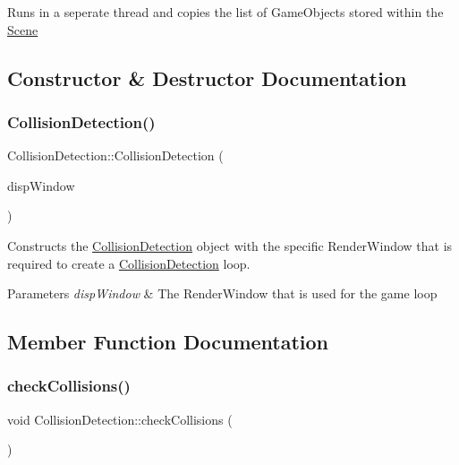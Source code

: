 Runs in a seperate thread and copies the list of Game\+Objects stored within the \hyperlink{class_scene}{Scene} 

\subsection{Constructor \& Destructor Documentation}
\mbox{\label{class_collision_detection_a2f88d35b750b96c0da3b09460d8f02bd}} 
\subsubsection{\texorpdfstring{Collision\+Detection()}{CollisionDetection()}}
{\footnotesize\ttfamily Collision\+Detection\+::\+Collision\+Detection (\begin{DoxyParamCaption}\item[{sf\+::\+Render\+Window $\ast$}]{disp\+Window }\end{DoxyParamCaption})}



Constructs the \hyperlink{class_collision_detection}{Collision\+Detection} object with the specific Render\+Window that is required to create a \hyperlink{class_collision_detection}{Collision\+Detection} loop. 


\begin{DoxyParams}{Parameters}
{\em disp\+Window} & The Render\+Window that is used for the game loop \\
\hline
\end{DoxyParams}


\subsection{Member Function Documentation}
\mbox{\label{class_collision_detection_a9b39c9264288db71452ce2f66a79c4f1}} 
\subsubsection{\texorpdfstring{check\+Collisions()}{checkCollisions()}}
{\footnotesize\ttfamily void Collision\+Detection\+::check\+Collisions (\begin{DoxyParamCaption}{ }\end{DoxyParamCaption})\hspace{0.3cm}{\ttfamily [private]}}




